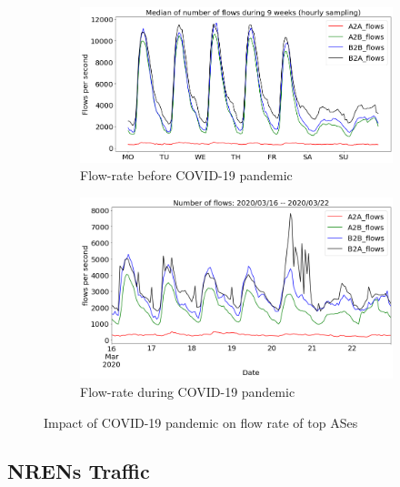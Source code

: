 \documentclass[10pt, journal, letterpaper]{IEEEtran}
\newcommand\figSzeMahdi{0.8}
\begin{document}
\begin{figure}
    \begin{subfigure}{\figSzeMahdi\columnwidth}
          \centering
          \includegraphics[width=\columnwidth]{img/BCO_acaBus_fps.png}
          \caption{Flow-rate before COVID-19 pandemic}
          \label{fig:BCO_acaBus_fps}
    \end{subfigure}
    \begin{subfigure}{\figSzeMahdi\columnwidth}
          \centering
          \includegraphics[width=\columnwidth]{img/CO2_acaBus_fps.png}
          \caption{Flow-rate during COVID-19 pandemic}
          \label{fig:CO_acaBus_fps}
    \end{subfigure}
    \caption{Impact of COVID-19 pandemic on flow rate of top ASes}
    \label{fig:flowrate_acaBus_BCO_CO}
\end{figure}
\subsection{NRENs Traffic}
\end{document}
